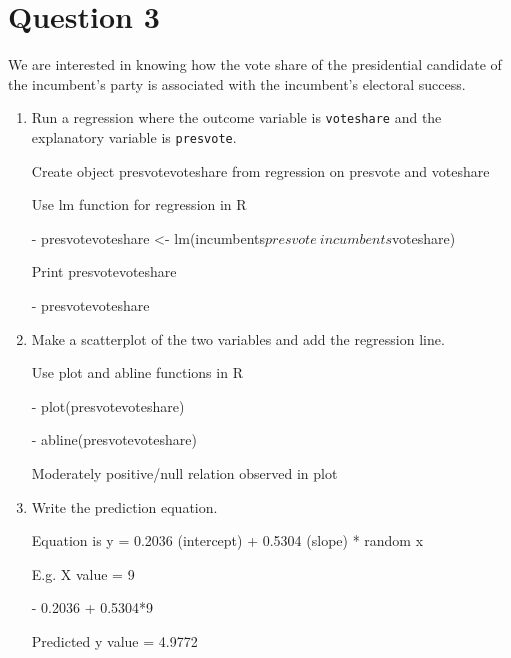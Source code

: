 \documentclass[12pt,letterpaper]{article}
\begin{document}
	\newpage	
\section*{Question 3}%

\noindent We are interested in knowing how the vote share of the presidential candidate of the incumbent's party is associated with the incumbent's electoral success.
	\vspace{.25cm}
	\begin{enumerate}
		\item Run a regression where the outcome variable is \texttt{voteshare} and the explanatory variable is \texttt{presvote}.
			\vspace{5cm}
			
		Create object presvotevoteshare from regression on presvote and voteshare
		
		Use lm function for regression in R
		
		- presvotevoteshare <- lm(incumbents$presvote ~ incumbents$voteshare)
	
	Print presvotevoteshare	
	
	-	presvotevoteshare	
	
		\item Make a scatterplot of the two variables and add the regression line. 
			\vspace{5cm}
			
			Use plot and abline functions in R
	
		-	plot(presvotevoteshare)
		
		-	abline(presvotevoteshare)
		
		Moderately positive/null relation observed in plot
		
		\item Write the prediction equation.
		
		Equation is y = 0.2036 (intercept) + 0.5304 (slope) * random x 
		
		E.g.  X value = 9
		 
		- 0.2036 + 0.5304*9
		
		Predicted y value = 4.9772
		
	\end{enumerate}
	

\newpage	
\end{document}
